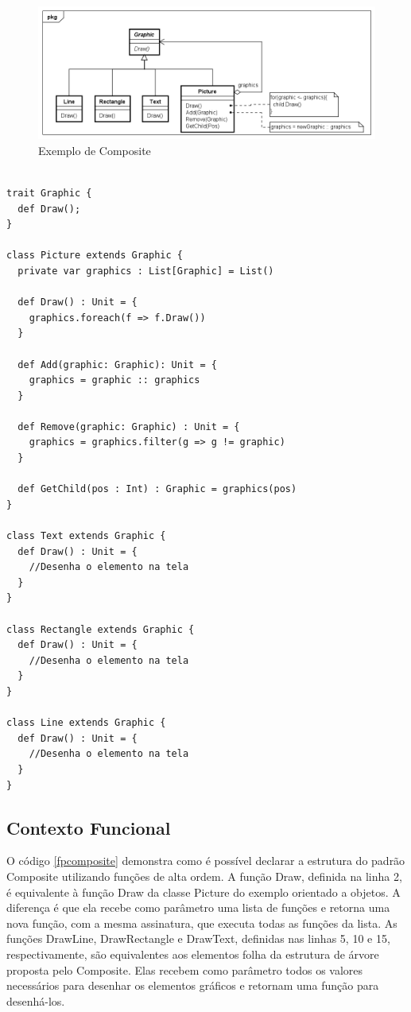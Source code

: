 \begin{figure}[htb]
	\caption{\label{composite_exemplo}Exemplo de Composite}
	\begin{center}
	    \includegraphics[scale=0.5]{5_padroes-contexto-funcional/5.2_estruturais/5.2.3_composite/composite_exemplo.png}
	\end{center}
\end{figure}

\begin{lstlisting}[caption={Composite Orientado a Objetos},label=oocomposite]

trait Graphic {
  def Draw();
}

class Picture extends Graphic {
  private var graphics : List[Graphic] = List()

  def Draw() : Unit = {
    graphics.foreach(f => f.Draw())
  }

  def Add(graphic: Graphic): Unit = {
    graphics = graphic :: graphics
  }

  def Remove(graphic: Graphic) : Unit = {
    graphics = graphics.filter(g => g != graphic)
  }

  def GetChild(pos : Int) : Graphic = graphics(pos)
}

class Text extends Graphic {
  def Draw() : Unit = {
    //Desenha o elemento na tela
  }
}

class Rectangle extends Graphic {
  def Draw() : Unit = {
    //Desenha o elemento na tela
  }
}

class Line extends Graphic {
  def Draw() : Unit = {
    //Desenha o elemento na tela
  }
}

\end{lstlisting}

\subsection*{Contexto Funcional}

O código \ref{fpcomposite} demonstra como é 
possível declarar a estrutura do padrão Composite 
utilizando funções de alta ordem. A função 
Draw, definida na linha 2, é equivalente à função 
Draw da classe Picture do exemplo orientado a 
objetos. A diferença é que ela recebe como parâmetro 
uma lista de funções e retorna uma nova função, 
com a mesma assinatura, que executa todas as 
funções da lista. As funções DrawLine, DrawRectangle 
e DrawText, definidas nas linhas 5, 10 e 15, 
respectivamente, são equivalentes aos elementos 
folha da estrutura de árvore proposta pelo 
Composite. Elas recebem como parâmetro todos 
os valores necessários para desenhar os elementos 
gráficos e retornam uma função para 
desenhá-los.

